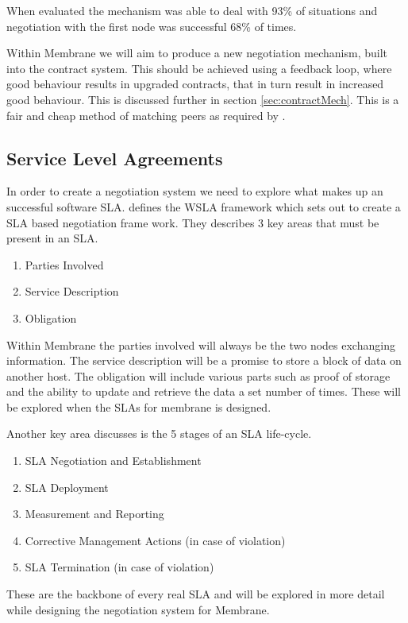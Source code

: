 \documentclass[11pt, a4paper, twocolumn, twoside]{report}
\begin{document}
When evaluated the mechanism was able to deal with 93\% of situations and negotiation with the first node was successful 68\% of times. \citep{herrero2007agents}

Within Membrane we will aim to produce a new negotiation mechanism, built into the  contract system. This should be achieved using a feedback loop, where good behaviour results in upgraded contracts, that in turn result in increased good behaviour. This is discussed further in section \ref{sec:contractMech}. This is a fair and cheap method of matching peers as required by \cite{rahwan2005interest}.

\subsection{Service Level Agreements}

In order to create a negotiation system we need to explore what makes up an successful software SLA. \cite{keller2002defining} defines the WSLA framework which sets out to create a SLA based negotiation frame work.
They describes 3 key areas that must be present in an SLA.
\begin{enumerate}
 \item Parties Involved
 \item Service Description
 \item Obligation
\end{enumerate}
Within Membrane the parties involved will always be the two nodes exchanging information. The service description will be a promise to store a block of data on another host. The obligation will include various parts such as proof of storage and the ability to update and retrieve the data a set number of times. These will be explored when the SLAs for membrane is designed.

Another key area \cite{keller2002defining} discusses is the 5 stages of an SLA life-cycle.
\begin{enumerate}
 \item SLA Negotiation and Establishment
 \item SLA Deployment
 \item Measurement and Reporting
 \item Corrective Management Actions (in case of violation)
 \item SLA Termination (in case of violation)
\end{enumerate}
These are the backbone of every real SLA and will be explored in more detail while designing the negotiation system for Membrane.
\end{document}
